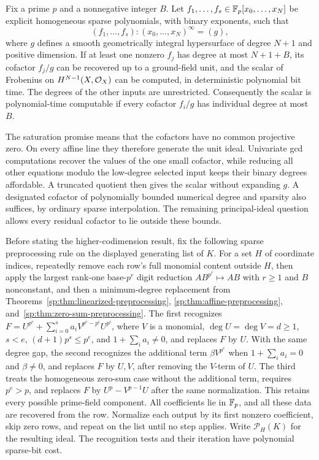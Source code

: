 \begin{theorem}\label{thm:saturation-intro}
Fix a prime $p$ and a nonnegative integer $B$. Let $f_1,\ldots,f_s\in\mathbb F_p[x_0,\ldots,x_N]$ be explicit homogeneous sparse polynomials, with binary exponents, such that
\[
(f_1,\ldots,f_s):(x_0,\ldots,x_N)^\infty=(g),
\]
where $g$ defines a smooth geometrically integral hypersurface of degree $N+1$ and positive dimension. If at least one nonzero $f_j$ has degree at most $N+1+B$, its cofactor $f_j/g$ can be recovered up to a ground-field unit, and the scalar of Frobenius on $H^{N-1}(X,\mathcal O_X)$ can be computed, in deterministic polynomial bit time. The degrees of the other inputs are unrestricted. Consequently the scalar is polynomial-time computable if every cofactor $f_i/g$ has individual degree at most $B$.
\end{theorem}

The saturation promise means that the cofactors have no common projective zero. On every affine line they therefore generate the unit ideal. Univariate gcd computations recover the values of the one small cofactor, while reducing all other equations modulo the low-degree selected input keeps their binary degrees affordable. A truncated quotient then gives the scalar without expanding $g$. A designated cofactor of polynomially bounded numerical degree and sparsity also suffices, by ordinary sparse interpolation. The remaining principal-ideal question allows every residual cofactor to lie outside these bounds.

Before stating the higher-codimension result, fix the following sparse
preprocessing rule on the displayed generating list of $K$.
For a set $H$ of coordinate indices, repeatedly
remove each row's full monomial content outside $H$, then apply the
largest rank-one base-$p^r$ digit reduction $AB^{p^r}\mapsto AB$
with $r\ge1$ and $B$ nonconstant, and then a minimum-degree
replacement from Theorems~\ref{sp:thm:linearized-preprocessing},
\ref{sp:thm:affine-preprocessing}, and~\ref{sp:thm:zero-sum-preprocessing}.
The first recognizes
$F=U^{p^e}+\sum_{i=0}^{s}a_i V^{p^e-p^i}U^{p^i}$, where
$V$ is a monomial, $\deg U=\deg V=d\ge1$, $s<e$,
$(d+1)p^s\le p^e$, and $1+\sum_i a_i\ne0$, and replaces $F$ by $U$.
With the same degree gap, the second recognizes the additional term
$\beta V^{p^e}$ when $1+\sum_i a_i=0$ and $\beta\ne0$, and replaces
$F$ by $U,V$, after removing the $V$-term of $U$.
The third treats the homogeneous zero-sum case without the additional
term, requires $p^e>p$, and replaces $F$ by $U^p-V^{p-1}U$ after the
same normalization. This retains every possible prime-field component.
All coefficients lie in $\mathbb F_p$, and all these data are recovered from
the row. Normalize each output by its first nonzero coefficient,
skip zero rows, and repeat on the list until no step applies.
Write $\mathcal P_H(K)$ for the resulting ideal. The recognition
tests and their iteration have polynomial sparse-bit cost.

